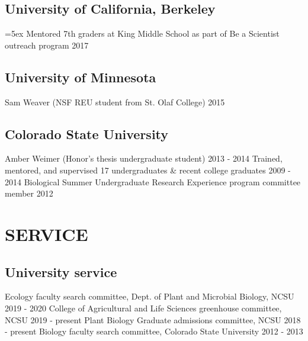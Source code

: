 \documentclass[11pt,english]{article}\usepackage[]{graphicx}\usepackage[]{color}
\begin{document}
\subsection*{University of California, Berkeley}
\hangindent=5ex Mentored 7th graders at King Middle School as part of Be a Scientist outreach program \hfill {2017} 

\subsection*{University of Minnesota}
Sam Weaver (NSF REU student from St. Olaf College)		 \hfill {2015} 

\subsection*{Colorado State University}
Amber Weimer (Honor's thesis undergraduate student)		 \hfill {2013 - 2014} \newline
Trained, mentored, and supervised 17 undergraduates \& recent college graduates		 \hfill {2009 - 2014} \newline
Biological Summer Undergraduate Research Experience program committee member \hfill {2012} 

\vspace{1.5ex}
\section*{SERVICE}
\vspace{-0.5ex}
\subsection*{University service}

Ecology faculty search committee, Dept. of Plant and Microbial Biology, NCSU \hfill{2019 - 2020 }\newline
College of Agricultural and Life Sciences greenhouse committee, NCSU \hfill{2019 - present}\newline
Plant Biology Graduate admissions committee, NCSU \hfill{2018 - present} \newline 
Biology faculty search committee, Colorado State University \hfill{2012 - 2013} 
\end{document}
